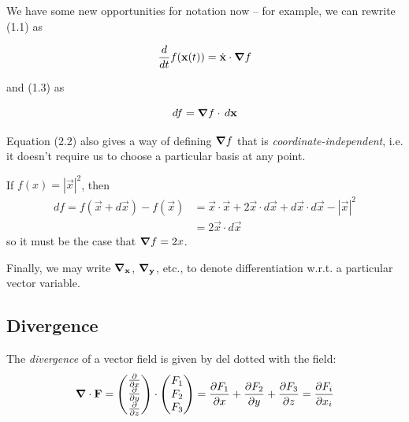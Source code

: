 \documentclass{../template/note}
\begin{document}
    We have some new opportunities for notation now -- for example, we can rewrite (1.1) as

    \begin{proposition}
        \label{2.1} \[
            \frac{d}{dt} f(\vec x(t)) = \dot{\vec x} \cdot \grad f
        \]
    \end{proposition}
    
    and (1.3) as

    \begin{proposition}
        \label{2.2} \[
            df = \grad f \cdot \D{\V x}
        \]
    \end{proposition}
    
    
    
    Equation (2.2) also gives a way of defining \(\grad f\) that is \emph{coordinate-independent}, i.e. it doesn't require us to choose a particular basis at any point.
    
    
    \begin{example*}
        If \(f(x) = |\vec x|^2\), then
        \begin{align*}
            df = f(\vec x + d\vec x) - f(\vec x) &= \vec x \cdot \vec x + 2 \vec x \cdot d \vec x + d \vec x \cdot d \vec x - |\vec x|^2 \\
            &= 2\vec x \cdot d \vec x
        \end{align*}
        so it must be the case that \(\grad f = 2x\).        
    \end{example*}
    
    Finally, we may write \(\grad_{\vec x}\), \(\grad_{\vec y}\), etc., to denote differentiation w.r.t. a particular vector variable.
    
    \subsection{Divergence}

    \begin{definition*}
        The \emph{divergence} of a vector field is given by del dotted with the field:
        \begin{align*}
            \div \vec F = \begin{pmatrix}
             \pd{}{x} \\
             \pd{}{y} \\
             \pd{}{z} \\
            \end{pmatrix} \cdot \begin{pmatrix}
             F_1 \\
             F_2 \\
             F_3 \\
            \end{pmatrix} = \pd{F_1}{x} + \pd{F_2}{y} + \pd{F_3}{z} = \pd{F_i}{x_i}
        \end{align*}        
    \end{definition*}
\end{document}
